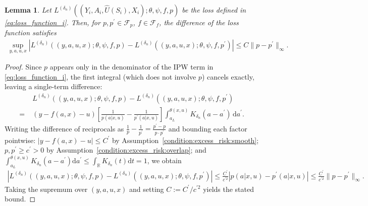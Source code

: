 \documentclass[12pt]{article}
\newtheorem{lemma}{Lemma}%
\newcommand{\R}{\mathbb{R}}
\begin{document}
\begin{lemma}\label{lemma:L_i_diff_p}
    Let $L^{(\delta_n)}((Y_i,A_i,\widehat U(S_i),X_i);\theta,\psi,f,p)$ be the loss defined in \eqref{eq:loss_function_i}. Then, for $p,p^\prime\in\mathcal{F}_p$, $f\in\mathcal{F}_f$, the difference of the loss function satisfies
    \begin{align*}
        \sup_{y,a,u,x}\left|L^{(\delta_n)}((y,a,u,x);\theta,\psi,f,p) - L^{(\delta_n)}((y,a,u,x);\theta,\psi,f,p^\prime)\right| \leq C\|p-p^\prime\|_\infty.
    \end{align*}
\end{lemma}

\begin{proof}
Since $p$ appears only in the denominator of the IPW term in \eqref{eq:loss_function_i}, the first integral (which does not involve $p$) cancels exactly, leaving a single-term difference:
\begin{align*}
    &L^{(\delta_n)}((y,a,u,x);\theta,\psi,f,p) - L^{(\delta_n)}((y,a,u,x);\theta,\psi,f,p^\prime)\\
    =\;&\left(y-f(a,x)-u\right)\left[\frac{1}{p(a|x,u)}-\frac{1}{p^\prime(a|x,u)}\right]\int_{a_L}^{\theta(x,u)}K_{\delta_n}(a-a^\prime)\,\mathrm{d}a^\prime.
\end{align*}
Writing the difference of reciprocals as $\frac{1}{p}-\frac{1}{p^\prime} = \frac{p^\prime-p}{p\cdot p^\prime}$ and bounding each factor pointwise: $|y-f(a,x)-u|\leq C^\prime$ by Assumption~\ref{condition:excess_risk:smooth}; $p,p^\prime\geq c^\prime>0$ by Assumption~\ref{condition:excess_risk:overlap}; and $\int_{a_L}^{\theta(x,u)}K_{\delta_n}(a-a^\prime)\mathrm{d}a^\prime\leq\int_\R K_{\delta_n}(t)\mathrm{d}t=1$, we obtain
\begin{align*}
    \left|L^{(\delta_n)}((y,a,u,x);\theta,\psi,f,p) - L^{(\delta_n)}((y,a,u,x);\theta,\psi,f,p^\prime)\right|
    \leq \frac{C^\prime}{c^{\prime 2}}\left|p(a|x,u)-p^\prime(a|x,u)\right|
    \leq \frac{C^\prime}{c^{\prime 2}}\|p-p^\prime\|_\infty.
\end{align*}
Taking the supremum over $(y,a,u,x)$ and setting $C:=C^\prime/c^{\prime 2}$ yields the stated bound.
\end{proof}
\end{document}

